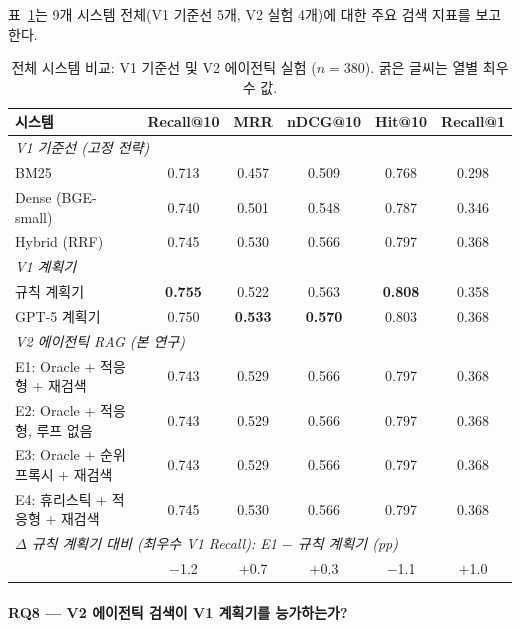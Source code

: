 표~\ref{tab:v2_full_comparison_ko}는 9개 시스템 전체(V1 기준선 5개, V2 실험 4개)에 대한 주요 검색 지표를 보고한다.

\begin{table}[htbp]
\centering
\caption{전체 시스템 비교: V1 기준선 및 V2 에이전틱 실험 ($n{=}380$). 굵은 글씨는 열별 최우수 값.}
\label{tab:v2_full_comparison_ko}
\begin{tabular}{lccccc}
\toprule
\textbf{시스템} & \textbf{Recall@10} & \textbf{MRR} & \textbf{nDCG@10} & \textbf{Hit@10} & \textbf{Recall@1} \\
\midrule
\multicolumn{6}{l}{\textit{V1 기준선 (고정 전략)}} \\
BM25                     & 0.713 & 0.457 & 0.509 & 0.768 & 0.298 \\
Dense (BGE-small)        & 0.740 & 0.501 & 0.548 & 0.787 & 0.346 \\
Hybrid (RRF)             & 0.745 & 0.530 & 0.566 & 0.797 & 0.368 \\
\midrule
\multicolumn{6}{l}{\textit{V1 계획기}} \\
규칙 계획기              & \textbf{0.755} & 0.522 & 0.563 & \textbf{0.808} & 0.358 \\
GPT-5 계획기             & 0.750 & \textbf{0.533} & \textbf{0.570} & 0.803 & 0.368 \\
\midrule
\multicolumn{6}{l}{\textit{V2 에이전틱 RAG (본 연구)}} \\
E1: Oracle + 적응형 + 재검색     & 0.743 & 0.529 & 0.566 & 0.797 & 0.368 \\
E2: Oracle + 적응형, 루프 없음   & 0.743 & 0.529 & 0.566 & 0.797 & 0.368 \\
E3: Oracle + 순위프록시 + 재검색 & 0.743 & 0.529 & 0.566 & 0.797 & 0.368 \\
E4: 휴리스틱 + 적응형 + 재검색  & 0.745 & 0.530 & 0.566 & 0.797 & 0.368 \\
\midrule
\multicolumn{6}{l}{\textit{$\Delta$ 규칙 계획기 대비 (최우수 V1 Recall): E1 $-$ 규칙 계획기 (pp)}} \\
\quad & $-$1.2 & $+$0.7 & $+$0.3 & $-$1.1 & $+$1.0 \\
\bottomrule
\end{tabular}
\end{table}

\FloatBarrier

\paragraph{RQ8 --- V2 에이전틱 검색이 V1 계획기를 능가하는가?}


